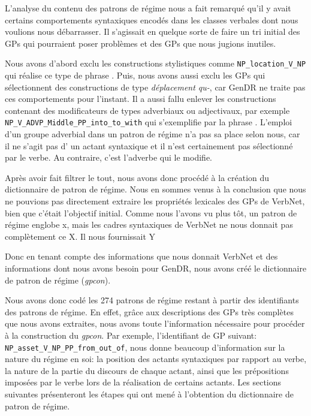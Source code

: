 L'analyse du contenu des patrons de régime nous a fait remarqué qu'il y avait certains comportements syntaxiques encodés dans les classes verbales dont nous voulions nous débarrasser. Il s'agissait en quelque sorte de faire un tri initial des \acp{GP} qui pourraient poser problèmes et des \acp{GP} que nous jugions inutiles. 

Nous avons d'abord exclu les constructions stylistiques comme \lstinline|NP_location_V_NP| qui réalise ce type de phrase . Puis, nous avons aussi exclu les \acp{GP} qui sélectionnent des constructions de type \emph{déplacement qu-}, car GenDR ne traite pas ces comportements pour l'instant. Il a aussi fallu enlever les constructions contenant des modificateurs de types adverbiaux ou adjectivaux, par exemple \lstinline|NP_V_ADVP_Middle_PP_into_to_with| qui s'exemplifie par la phrase . L'emploi d'un groupe adverbial dans un patron de régime n'a pas sa place selon nous, car il ne s'agit pas d' un actant syntaxique et il n'est certainement pas sélectionné par le verbe. Au contraire, c'est l'adverbe qui le modifie.

Après avoir fait filtrer le tout, nous avons donc procédé à la création du dictionnaire de patron de régime. Nous en sommes venus à la conclusion que nous ne pouvions pas directement extraire les propriétés lexicales des \acp{GP} de VerbNet, bien que c'était l'objectif initial. Comme nous l'avons vu plus tôt, un patron de régime englobe x, mais les cadres syntaxiques de VerbNet ne nous donnait pas complètement ce X. Il nous fournissait Y %

Donc en tenant compte des informations que nous donnait VerbNet et des informations dont nous avons besoin pour GenDR, nous avons créé le dictionnaire de patron de régime (\emph{gpcon}).

Nous avons donc codé les 274 patrons de régime restant à partir des identifiants des patrons de régime. En effet, grâce aux descriptions des \acp{GP} très complètes que nous avons extraites, nous avons toute l'information nécessaire pour procéder à la construction du \emph{gpcon}. Par exemple, l'identifiant de \ac{GP} suivant: \texttt{NP\_asset\_V\_NP\_PP\_from\_out\_of}, nous donne beaucoup d'information sur la nature du régime en soi: la position des actants syntaxiques par rapport au verbe, la nature de la partie du discours de chaque actant, ainsi que les prépositions imposées par le verbe lors de la réalisation de certains actants. Les sections suivantes présenteront les étapes qui ont mené à l'obtention du dictionnaire de patron de régime.

